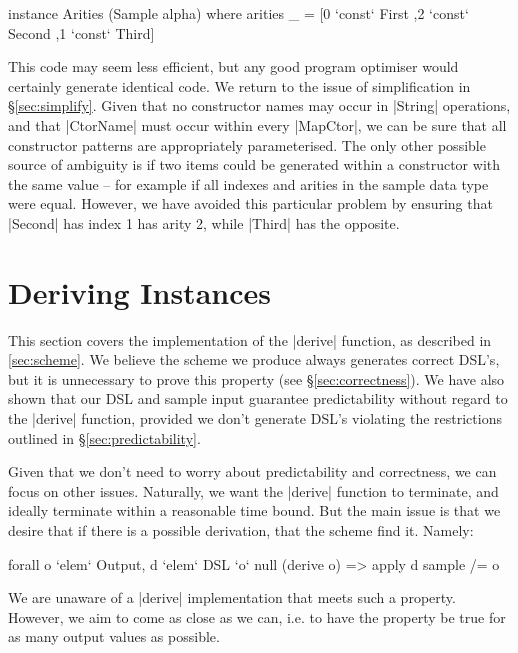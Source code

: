 \documentclass[preprint,draft]{sigplanconf}
\begin{document}
\begin{code}
instance Arities (Sample alpha) where
    arities _ =  [0 `const` First{}
                 ,2 `const` Second{}
                 ,1 `const` Third{}]
\end{code}

This code may seem less efficient, but any good program optimiser would certainly generate identical code. We return to the issue of simplification in \S\ref{sec:simplify}. Given that no constructor names may occur in |String| operations, and that |CtorName| must occur within every |MapCtor|, we can be sure that all constructor patterns are appropriately parameterised. The only other possible source of ambiguity is if two items could be generated within a constructor with the same value -- for example if all indexes and arities in the sample data type were equal. However, we have avoided this particular problem by ensuring that |Second| has index 1 has arity 2, while |Third| has the opposite.

\section{Deriving Instances}
\label{sec:guess}

This section covers the implementation of the |derive| function, as described in \ref{sec:scheme}. We believe the scheme we produce always generates correct DSL's, but it is unnecessary to prove this property (see \S\ref{sec:correctness}). We have also shown that our DSL and sample input guarantee predictability without regard to the |derive| function, provided we don't generate DSL's violating the restrictions outlined in \S\ref{sec:predictability}.

Given that we don't need to worry about predictability and correctness, we can focus on other issues. Naturally, we want the |derive| function to terminate, and ideally terminate within a reasonable time bound. But the main issue is that we desire that if there is a possible derivation, that the scheme find it. Namely:

\ignore\begin{code}
forall o `elem` Output, d `elem` DSL `o` null (derive o) => apply d sample /= o
\end{code}

We are unaware of a |derive| implementation that meets such a property. However, we aim to come as close as we can, i.e. to have the property be true for as many output values as possible.
\end{document}

